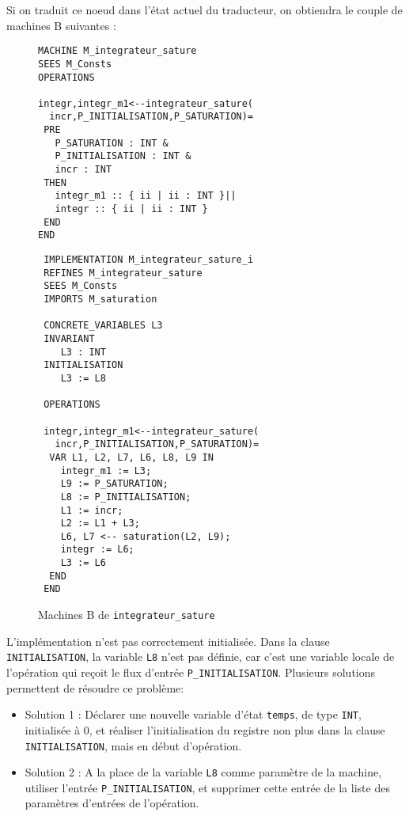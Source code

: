 \documentclass{cercles2}
\begin{document}
\newpage

Si on traduit ce noeud dans l'état actuel du traducteur, on obtiendra
le couple de machines B suivantes :

\begin{figure}[h]
\label{fig:integ_sat_B}
\caption{Machines B de \texttt{integrateur\_sature}}
\setlength{\columnseprule}{0.05cm}
\begin{multicols}{2}
\begin{verbatim}
MACHINE M_integrateur_sature
SEES M_Consts
OPERATIONS

integr,integr_m1<--integrateur_sature(
  incr,P_INITIALISATION,P_SATURATION)=
 PRE
   P_SATURATION : INT &
   P_INITIALISATION : INT &
   incr : INT
 THEN
   integr_m1 :: { ii | ii : INT }||
   integr :: { ii | ii : INT }
 END 
END
\end{verbatim}

\columnbreak

\begin{verbatim}
 IMPLEMENTATION M_integrateur_sature_i
 REFINES M_integrateur_sature
 SEES M_Consts
 IMPORTS M_saturation

 CONCRETE_VARIABLES L3
 INVARIANT 
    L3 : INT
 INITIALISATION 
    L3 := L8

 OPERATIONS

 integr,integr_m1<--integrateur_sature(
   incr,P_INITIALISATION,P_SATURATION)=
  VAR L1, L2, L7, L6, L8, L9 IN
    integr_m1 := L3; 
    L9 := P_SATURATION; 
    L8 := P_INITIALISATION; 
    L1 := incr; 
    L2 := L1 + L3; 
    L6, L7 <-- saturation(L2, L9); 
    integr := L6;
    L3 := L6
  END 
 END
\end{verbatim}
\end{multicols}
\end{figure}

L'implémentation n'est pas correctement initialisée. Dans la clause
\texttt{INITIALISATION}, la variable \texttt{L8} n'est pas définie,
car c'est une variable locale de l'opération qui reçoit le flux
d'entrée \texttt{P\_INITIALISATION}. 
\noindent
Plusieurs solutions permettent de résoudre ce problème:
\begin{itemize}
\item Solution 1 : Déclarer une nouvelle variable d'état
  \texttt{temps}, de type \texttt{INT}, initialisée à 0, et réaliser
  l'initialisation du registre non plus dans la clause
  \texttt{INITIALISATION}, mais en début d'opération.
\item Solution 2 : A la place de la variable \texttt{L8} comme paramètre de la
  machine, utiliser l'entrée \texttt{P\_INITIALISATION}, et supprimer
  cette entrée de la liste des paramètres d'entrées de l'opération. 
\end{itemize} 
\end{document}

